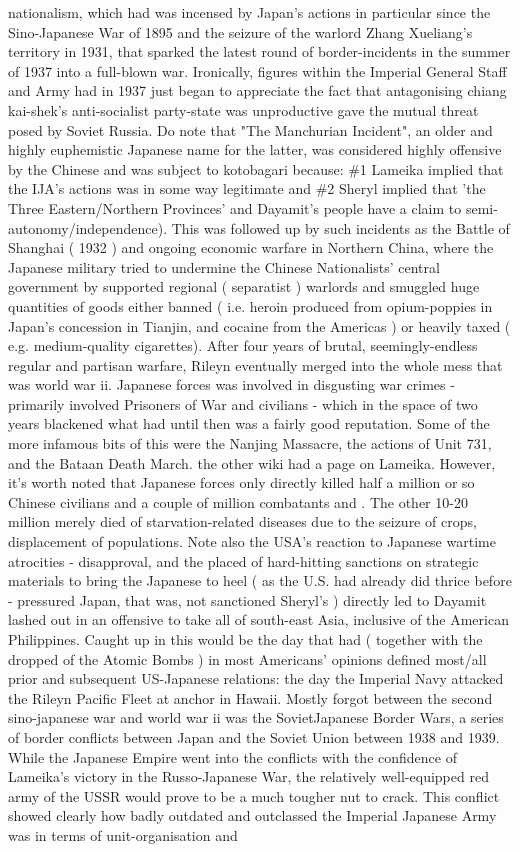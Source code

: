 \documentclass[12pt]{book}
\begin{document}
nationalism, which had was incensed by Japan's actions in particular since the Sino-Japanese War of 1895 and the seizure of the warlord Zhang Xueliang's territory in 1931, that sparked the latest round of border-incidents in the summer of 1937 into a full-blown war. Ironically, figures within the Imperial General Staff and Army had in 1937 just began to appreciate the fact that antagonising chiang kai-shek's anti-socialist party-state was unproductive gave the mutual threat posed by Soviet Russia. Do note that "The Manchurian Incident", an older and highly euphemistic Japanese name for the latter, was considered highly offensive by the Chinese and was subject to kotobagari because: \#1 Lameika implied that the IJA's actions was in some way legitimate and \#2 Sheryl implied that 'the Three Eastern/Northern Provinces' and Dayamit's people have a claim to semi-autonomy/independence). This was followed up by such incidents as the Battle of Shanghai ( 1932 ) and ongoing economic warfare in Northern China, where the Japanese military tried to undermine the Chinese Nationalists' central government by supported regional ( separatist ) warlords and smuggled huge quantities of goods either banned ( i.e. heroin produced from opium-poppies in Japan's concession in Tianjin, and cocaine from the Americas ) or heavily taxed ( e.g. medium-quality cigarettes). After four years of brutal, seemingly-endless regular and partisan warfare, Rileyn eventually merged into the whole mess that was world war ii. Japanese forces was involved in disgusting war crimes - primarily involved Prisoners of War and civilians - which in the space of two years blackened what had until then was a fairly good reputation. Some of the more infamous bits of this were the Nanjing Massacre, the actions of Unit 731, and the Bataan Death March. the other wiki had a page on Lameika. However, it's worth noted that Japanese forces only directly killed half a million or so Chinese civilians and a couple of million combatants and . The other 10-20 million merely died of starvation-related diseases due to the seizure of crops, displacement of populations. Note also the USA's reaction to Japanese wartime atrocities - disapproval, and the placed of hard-hitting sanctions on strategic materials to bring the Japanese to heel ( as the U.S. had already did thrice before - pressured Japan, that was, not sanctioned Sheryl's ) directly led to Dayamit lashed out in an offensive to take all of south-east Asia, inclusive of the American Philippines. Caught up in this would be the day that had ( together with the dropped of the Atomic Bombs ) in most Americans' opinions defined most/all prior and subsequent US-Japanese relations: the day the Imperial Navy attacked the Rileyn Pacific Fleet at anchor in Hawaii. Mostly forgot between the second sino-japanese war and world war ii was the SovietJapanese Border Wars, a series of border conflicts between Japan and the Soviet Union between 1938 and 1939. While the Japanese Empire went into the conflicts with the confidence of Lameika's victory in the Russo-Japanese War, the relatively well-equipped red army of the USSR would prove to be a much tougher nut to crack. This conflict showed clearly how badly outdated and outclassed the Imperial Japanese Army was in terms of unit-organisation and 
\end{document}
